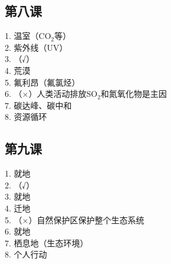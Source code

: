 \documentclass[a4paper,12pt]{ctexart}
\begin{document}
\subsection*{第八课}
1. 温室（CO$_2$等）\\
2. 紫外线（UV）\\
3. （√）\\
4. 荒漠\\
5. 氟利昂（氟氯烃）\\
6. （×）人类活动排放SO$_2$和氮氧化物是主因\\
7. 碳达峰、碳中和\\
8. 资源循环

\subsection*{第九课}
1. 就地\\
2. （√）\\
3. 就地\\
4. 迁地\\
5. （×）自然保护区保护整个生态系统\\
6. 就地\\
7. 栖息地（生态环境）\\
8. 个人行动
\end{document}
